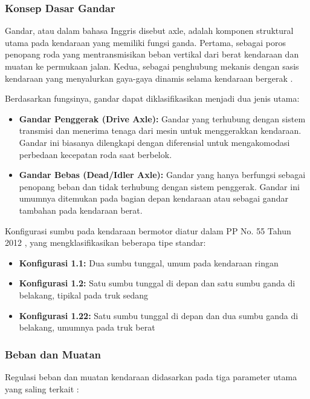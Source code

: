 \subsubsection{Konsep Dasar Gandar}
Gandar, atau dalam bahasa Inggris disebut axle, adalah komponen struktural utama pada kendaraan yang memiliki fungsi ganda. Pertama, sebagai poros penopang roda yang mentransmisikan beban vertikal dari berat kendaraan dan muatan ke permukaan jalan. Kedua, sebagai penghubung mekanis dengan sasis kendaraan yang menyalurkan gaya-gaya dinamis selama kendaraan bergerak \parencite*{cebon1989assessment}.

Berdasarkan fungsinya, gandar dapat diklasifikasikan menjadi dua jenis utama:
\begin{itemize}[nolistsep]
  \item \textbf{Gandar Penggerak (Drive Axle):} Gandar yang terhubung dengan sistem transmisi dan menerima tenaga dari mesin untuk menggerakkan kendaraan. Gandar ini biasanya dilengkapi dengan diferensial untuk mengakomodasi perbedaan kecepatan roda saat berbelok.
  \item \textbf{Gandar Bebas (Dead/Idler Axle):} Gandar yang hanya berfungsi sebagai penopang beban dan tidak terhubung dengan sistem penggerak. Gandar ini umumnya ditemukan pada bagian depan kendaraan atau sebagai gandar tambahan pada kendaraan berat.
\end{itemize}

Konfigurasi sumbu pada kendaraan bermotor diatur dalam PP No. 55 Tahun 2012 \parencite*{ppno55thn2012}, yang mengklasifikasikan beberapa tipe standar:
\begin{itemize}[nolistsep]
  \item \textbf{Konfigurasi 1.1:} Dua sumbu tunggal, umum pada kendaraan ringan
  \item \textbf{Konfigurasi 1.2:} Satu sumbu tunggal di depan dan satu sumbu ganda di belakang, tipikal pada truk sedang
  \item \textbf{Konfigurasi 1.22:} Satu sumbu tunggal di depan dan dua sumbu ganda di belakang, umumnya pada truk berat
\end{itemize}

\subsubsection{Beban dan Muatan}
Regulasi beban dan muatan kendaraan didasarkan pada tiga parameter utama yang saling terkait \parencite*{kemenhub2015}:

